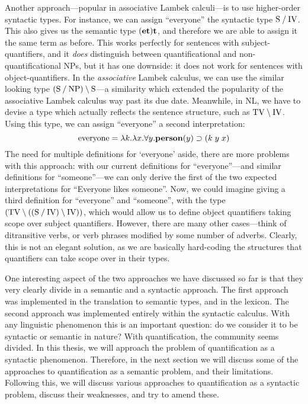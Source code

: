 Another approach---popular in associative Lambek calculi---is to use
higher-order syntactic types. For instance, we can assign ``everyone''
the syntactic type $\text{S}\mathbin{\slash}\text{IV}$. This also gives us the semantic type
$(\mathbf{e}\mathbf{t})\mathbf{t}$, and therefore we are able to assign it the same term as
before. This works perfectly for sentences with subject-quantifiers,
and it \emph{does} distinguish between quantificational and
non-quantificational NPs, but it has one downside: it does not work
for sentences with object-quantifiers.
In the \emph{associative} Lambek calculus, we can use the similar
looking type $(\text{S}\mathbin{\slash}\text{NP})\mathbin{\backslash}\text{S}$---a similarity which extended the
popularity of the associative Lambek calculus way past its due
date. Meanwhile, in NL, we have to devise a type which actually
reflects the sentence structure, such as $\text{TV}\mathbin{\backslash}\text{IV}$. Using
this type, we can assign ``everyone'' a second interpretation:
\[
  \text{everyone} = \lambda k.\lambda x.\forall y.\mathbf{person}(y)\supset(k\;y\;x)
\]
The need for multiple definitions for `everyone' aside, there are more
problems with this approach: with our current definitions for
``everyone''---and similar definitions for ``someone''---we can only
derive the first of the two expected interpretations for ``Everyone
likes someone''.
Now, we could imagine giving a third definition for ``everyone'' and
``someone'', with the type $(\text{TV}\mathbin{\backslash}((\text{S}\mathbin{\slash}\text{IV})\mathbin{\backslash}\text{IV}))$, which
would allow us to define object quantifiers taking scope over subject
quantifiers. However, there are many other cases---think of
ditransitive verbs, or verb phrases modified by some number of
adverbs. Clearly, this is not an elegant solution, as we are basically
hard-coding the structures that quantifiers can take scope over in
their types.

\vspace*{1\baselineskip}

One interesting aspect of the two approaches we have discussed so far
is that they very clearly divide in a semantic and a syntactic
approach. The first approach was implemented in the translation to
semantic types, and in the lexicon. The second approach was
implemented entirely within the syntactic calculus. With any
linguistic phenomenon this is an important question: do we consider it
to be syntactic or semantic in nature? With quantification, the
community seems divided. In this thesis, we will approach the problem
of quantification as a syntactic phenomenon. Therefore, in the
next section we will discuss some of the approaches to quantification
as a semantic problem, and their limitations. Following this, we will
discuss various approaches to quantification as a syntactic problem,
discuss their weaknesses, and try to amend these.


